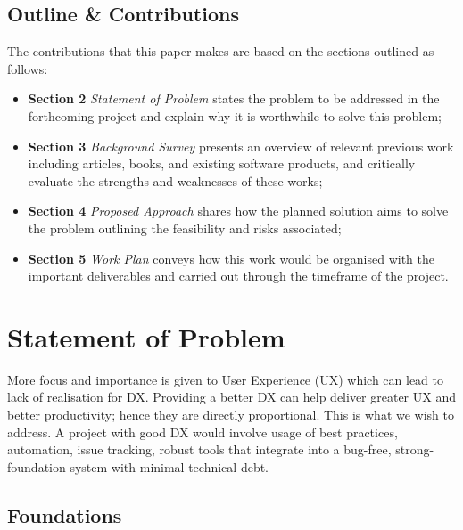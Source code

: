 \documentclass{mprop}
\begin{document}
\subsection{Outline \& Contributions}

The contributions that this paper makes are based on the sections outlined as follows:

\begin{itemize}
    \setlength\itemsep{0.6em}
    \item \textbf{Section 2} \textit{Statement of Problem} states the problem to be addressed in the forthcoming project and explain why it is worthwhile to solve this problem;
    \item \textbf{Section 3} \textit{Background Survey} presents an overview of relevant previous work including articles, books, and existing software products, and critically evaluate the strengths and weaknesses of these works;
    \item \textbf{Section 4} \textit{Proposed Approach} shares how the planned solution aims to solve the problem outlining the feasibility and risks associated;
    \item \textbf{Section 5} \textit{Work Plan} conveys how this work would be organised with the important deliverables and carried out through the timeframe of the project.
\end{itemize}

\newpage
\section{Statement of Problem}


More focus and importance is given to User Experience (UX) which can lead to lack of realisation for DX. Providing a better DX can help deliver greater UX and better productivity; hence they are directly proportional. This is what we wish to address. A project with good DX would involve usage of best practices, automation, issue tracking, robust tools that integrate into a bug-free, strong-foundation system with minimal technical debt.

\subsection{Foundations}\label{subsec:Foundations}
\end{document}
